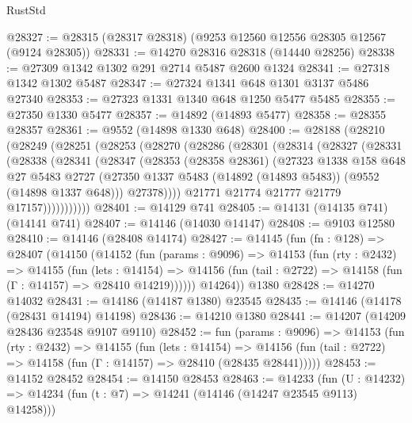 \begin{lexlean}{RustStd}
\begin{coremodule}
@28327 := @28315 (@28317 @28318) (@9253 @12560 @12556 @28305 @12567 (@9124 @28305))
@28331 := @14270 @28316 @28318 (@14440 @28256)
@28338 := @27309 @1342 @1302 @291 @2714 @5487 @2600 @1324
@28341 := @27318 @1342 @1302 @5487
@28347 := @27324 @1341 @648 @1301 @3137 @5486 @27340
@28353 := @27323 @1331 @1340 @648 @1250 @5477 @5485
@28355 := @27350 @1330 @5477
@28357 := @14892 (@14893 @5477)
@28358 := @28355 @28357
@28361 := @9552 (@14898 @1330 @648)
@28400 := @28188
    (@28210
      (@28249
        (@28251
          (@28253
            (@28270
              (@28286
                (@28301
                  (@28314
                    (@28327
                      (@28331
                        (@28338
                          (@28341
                            (@28347
                              (@28353
                                (@28358 @28361)
                                (@27323
                                  @1338
                                  @158
                                  @648
                                  @27
                                  @5483
                                  @2727
                                  (@27350
                                    @1337
                                    @5483
                                    (@14892 (@14893 @5483))
                                    (@9552 (@14898 @1337 @648)))
                                  @27378))))
                          @21771
                          @21774
                          @21777
                          @21779
                          @17157)))))))))))
@28401 := @14129 @741
@28405 := @14131 (@14135 @741) (@14141 @741)
@28407 := @14146 (@14030 @14147)
@28408 := @9103 @12580
@28410 := @14146 (@28408 @14174)
@28427 := @14145
    (fun (fn : @128) =>
    @28407
      (@14150
        (@14152
          (fun (params : @9096) =>
          @14153
            (fun (rty : @2432) =>
            @14155
              (fun (lets : @14154) =>
              @14156 (fun (tail : @2722) => @14158 (fun (Γ : @14157) => @28410 @14219))))))
        @14264))
    @1380
@28428 := @14270 @14032
@28431 := @14186 (@14187 @1380) @23545
@28435 := @14146 (@14178 (@28431 @14194) @14198)
@28436 := @14210 @1380
@28441 := @14207 (@14209 @28436 @23548 @9107 @9110)
@28452 := fun (params : @9096) =>
  @14153
    (fun (rty : @2432) =>
    @14155
      (fun (lets : @14154) =>
      @14156 (fun (tail : @2722) => @14158 (fun (Γ : @14157) => @28410 (@28435 @28441)))))
@28453 := @14152 @28452
@28454 := @14150 @28453
@28463 := @14233
    (fun (U : @14232) => @14234 (fun (t : @7) => @14241 (@14146 (@14247 @23545 @9113) @14258)))

\end{coremodule}
\end{lexlean}
